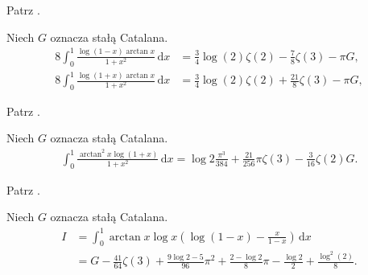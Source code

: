 
\begin{solution}
    Patrz \cite[s. 10, 11]{valean19}.
\end{solution}

\begin{problem_with_solution}
    \label{valean_1_20}%
    Niech $G$ oznacza stałą Catalana.
    \begin{align}
        8 \int_0^1 \frac{\log (1 - x) \arctan x}{1+x^2} \,\mathrm{d}x & = \frac 3 4 \log (2) \zeta(2) - \frac 7 8 \zeta(3) - \pi G, \\
        8 \int_0^1 \frac{\log (1 + x) \arctan x}{1+x^2} \,\mathrm{d}x & = \frac 3 4 \log (2) \zeta(2) + \frac {21} 8 \zeta(3) - \pi G,
    \end{align} 
\end{problem_with_solution}


\begin{solution}
    Patrz \cite[s. 12]{valean19}.
\end{solution}

\begin{problem_with_solution}
    \label{valean_1_21}%
    Niech $G$ oznacza stałą Catalana.
    \begin{align}
        \int_0^1 \frac{\arctan^2 x \log (1 + x)}{1 + x^2} \,\mathrm{d} x = \log 2 \frac {\pi^3}{384} + \frac {21}{256} \pi \zeta(3) - \frac{3}{16} \zeta (2) G.
    \end{align} 
\end{problem_with_solution}


\begin{solution}
    Patrz \cite[s. 12]{valean19}.
\end{solution}

\begin{problem_with_solution}
    \label{valean_1_22}%
    Niech $G$ oznacza stałą Catalana.
    \begin{align}
        I & = \int_0^1 \arctan x \log x \left(\log (1-x) - \frac {x}{1-x}\right) \,\mathrm{d} x \\
        & = G - \frac{41}{64} \zeta (3) + \frac{9 \log 2 - 5}{96} \pi^2 + \frac{2 - \log 2}{8} \pi - \frac {\log 2}{2} + \frac{\log^2 (2)}{8}.
    \end{align} 
\end{problem_with_solution}

